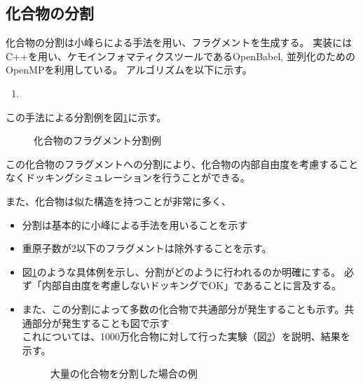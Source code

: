 \subsection{化合物の分割}
化合物の分割は小峰らによる手法\citetodo{}を用い、フラグメントを生成する。
実装にはC++を用い、ケモインフォマティクスツールであるOpenBabel\cite{OBoyle2011}, 並列化のためのOpenMPを利用している。
アルゴリズムを以下に示す。
\begin{enumerate} 
\item 
\end{enumerate}
この手法による分割例を図\ref{fig:ex_decomposition}に示す。
\begin{figure}[htp]
 \begin{center}
  \caption{化合物のフラグメント分割例}
  \label{fig:ex_decomposition}
 \end{center}
\end{figure}
この化合物のフラグメントへの分割により、化合物の内部自由度を考慮することなくドッキングシミュレーションを行うことができる。

また、化合物は似た構造を持つことが非常に多く、

\begin{itemize}
\item 分割は基本的に小峰による手法を用いることを示す\citetodo{}
\item 重原子数が2以下のフラグメントは除外することを示す。
\item 図\ref{fig:ex_decomposition}のような具体例を示し、分割がどのように行われるのか明確にする。
	必ず「内部自由度を考慮しないドッキングでOK」であることに言及する。
\item また、この分割によって多数の化合物で共通部分が発生することも示す。共通部分が発生することも図で示す\\
	これについては、1000万化合物に対して行った実験（図\ref{fig:decomposition_amount}）を説明、結果を示す。
	\begin{figure}[htp]
	 \begin{center}
	  \caption{大量の化合物を分割した場合の例}
	  \label{fig:decomposition_amount}
	 \end{center}
	\end{figure}

\end{itemize}

